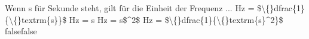     {Wenn s für Sekunde steht, gilt für die Einheit der Frequenz ...}
    {Hz = \$\textbackslash\{\}dfrac\{1\}\{\textbackslash\{\}textrm\{s\}\}\$}
    {Hz = s}
    {Hz = s\$\textasciicircum{}2\$}
    {Hz = \$\textbackslash\{\}dfrac\{1\}\{\textbackslash\{\}textrm\{s\}\textasciicircum{}2\}\$}
    {false}{false}